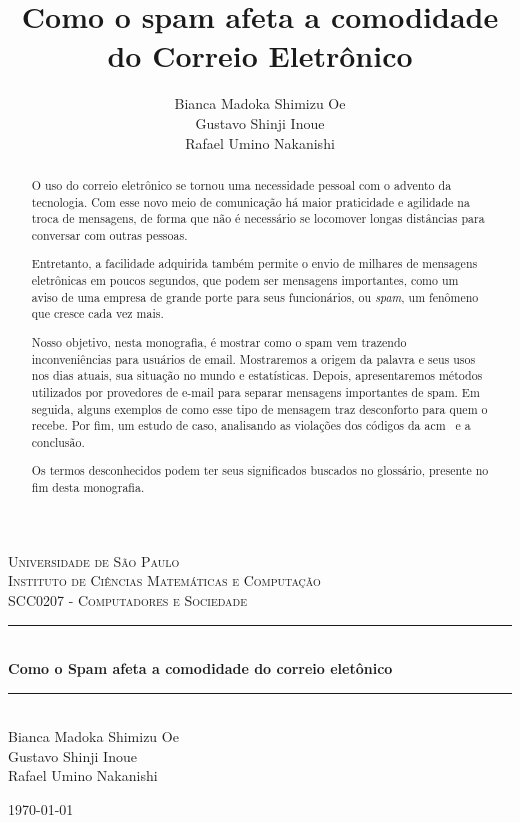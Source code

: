\documentclass[a4paper,dvipdfm]{article}
\title{Como o spam afeta a comodidade do Correio Eletrônico}
\author{Bianca Madoka Shimizu Oe\\
		Gustavo Shinji Inoue\\
		Rafael Umino Nakanishi}
\begin{document}
\begin{titlepage}
	\begin{center}
		\textsc{\huge Universidade de São Paulo}\\[0.3cm]
		\textsc{\Large Instituto de Ciências Matemáticas e Computação}\\[0.5cm]
		\textsc{\large SCC0207 - Computadores e Sociedade}\\[2.5in]
	
		\rule{\linewidth}{0.5mm} \\[0.7cm]
		{ \huge \bfseries Como o Spam afeta a comodidade do correio eletônico}\\[0.6cm]
		\rule{\linewidth}{0.5mm}\\[3in]

		{\large Bianca Madoka Shimizu Oe\\
		Gustavo Shinji Inoue\\
		Rafael Umino Nakanishi\\}

	\vfill
	\today
	\end{center}
\end{titlepage}

\newpage

\begin{abstract}
	O uso do correio eletrônico se tornou uma necessidade pessoal com o advento da tecnologia. Com esse novo meio de comunicação há maior praticidade e agilidade na troca de mensagens, de forma que não é necessário se locomover longas distâncias para conversar com outras pessoas.

	Entretanto, a facilidade adquirida também permite o envio de milhares de mensagens eletrônicas em poucos segundos, que podem ser mensagens importantes, como um aviso de uma empresa de grande porte para seus funcionários, ou \emph{spam}, um fenômeno que cresce cada vez mais.

	Nosso objetivo, nesta monografia, é mostrar como o spam vem trazendo inconveniências para usuários de \gls{email}.
	Mostraremos a origem da palavra e seus usos nos dias atuais, sua situação no mundo e estatísticas.
	Depois, apresentaremos métodos utilizados por provedores de e-mail para separar mensagens importantes de spam.
	Em seguida, alguns exemplos de como esse tipo de mensagem traz desconforto para quem o recebe. 
	Por fim, um estudo de caso, analisando as violações dos códigos da \gls{acm}~\cite{acm} e a conclusão.
	
	Os termos desconhecidos podem ter seus significados buscados no glossário, presente no fim desta monografia.
\end{abstract}
\end{document}
